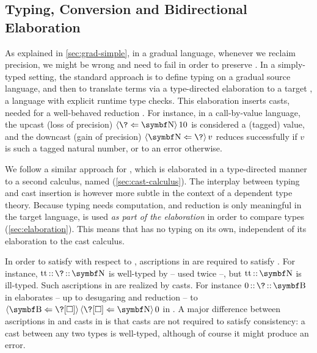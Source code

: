 \subsection{Typing, Conversion and Bidirectional Elaboration}

As explained in \cref{sec:grad-simple},
in a gradual language, whenever we reclaim precision, we might be wrong and need to fail in order to preserve .
%
In a simply-typed setting, the standard approach is to define typing on a
gradual source language, and then to translate terms via a type-directed elaboration
to a target , \ie a language with explicit runtime type
checks.
This elaboration inserts casts, needed for a well-behaved reduction .
For instance, in a call-by-value language, the upcast (loss of precision)
$\cast{10}{\Nat}{\?}$ is considered a (tagged) value,
and the downcast (gain of precision) $\cast{v}{\?}{\Nat}$ reduces successfully
if $v$ is such a tagged natural number, or to an error otherwise.

We follow a similar approach for , which is
elaborated in a type-directed manner to a second calculus,
named  (\cref{sec:cast-calculus}).
The interplay between typing and cast insertion is however more subtle in the
context of a dependent type theory. Because typing needs computation, and
reduction is only meaningful in the target language,  is used
\emph{as part of the elaboration} in order to compare types (\cref{sec:elaboration}).
This means that  has no typing on its own, independent of its
elaboration to the cast calculus.%

In order to satisfy  with respect to , ascriptions in 
are required to satisfy . For instance, $\asc{\asc{\true}{\?}}{\Nat}$ is well-typed by  – used twice –, but $\asc{\true}{\Nat}$ is ill-typed.
Such ascriptions in  are realized by casts.
For instance $\asc{\asc{0}{\?}}{\Bool}$ in  elaborates
– up to desugaring and reduction – to
$\cast{\cast{0}{\Nat}{\?[\uni]}}{\?[\uni]}{\Bool}$ in .
A major difference between ascriptions in  and casts in  is
that casts are not required to satisfy consistency: a cast between any
two types is well-typed, although of course it might produce an
error.

